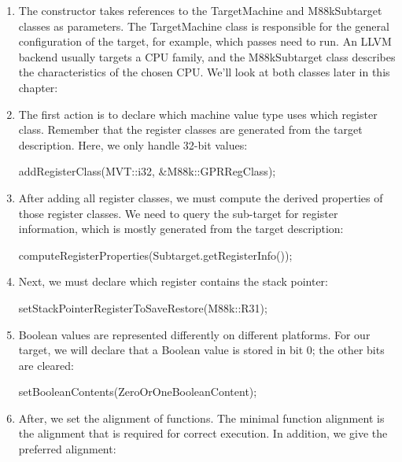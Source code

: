 \begin{enumerate}
\item
The constructor takes references to the TargetMachine and M88kSubtarget classes as parameters. The TargetMachine class is responsible for the general configuration of the target, for example, which passes need to run. An LLVM backend usually targets a CPU family, and the M88kSubtarget class describes the characteristics of the chosen CPU. We’ll look at both classes later in this chapter:

\begin{cpp}
M88kTargetLowering::M88kTargetLowering(
    const TargetMachine &TM, const M88kSubtarget &STI)
    : TargetLowering(TM), Subtarget(STI) {
\end{cpp}

\item
The first action is to declare which machine value type uses which register class. Remember that the register classes are generated from the target description. Here, we only handle 32-bit values:

\begin{cpp}
    addRegisterClass(MVT::i32, &M88k::GPRRegClass);
\end{cpp}

\item
After adding all register classes, we must compute the derived properties of those register classes. We need to query the sub-target for register information, which is mostly generated from the target description:

\begin{cpp}
computeRegisterProperties(Subtarget.getRegisterInfo());
\end{cpp}

\item
Next, we must declare which register contains the stack pointer:

\begin{cpp}
setStackPointerRegisterToSaveRestore(M88k::R31);
\end{cpp}

\item
Boolean values are represented differently on different platforms. For our target, we will declare that a Boolean value is stored in bit 0; the other bits are cleared:

\begin{cpp}
setBooleanContents(ZeroOrOneBooleanContent);
\end{cpp}

\item
After, we set the alignment of functions. The minimal function alignment is the alignment that is required for correct execution. In addition, we give the preferred alignment:


\end{enumerate}
